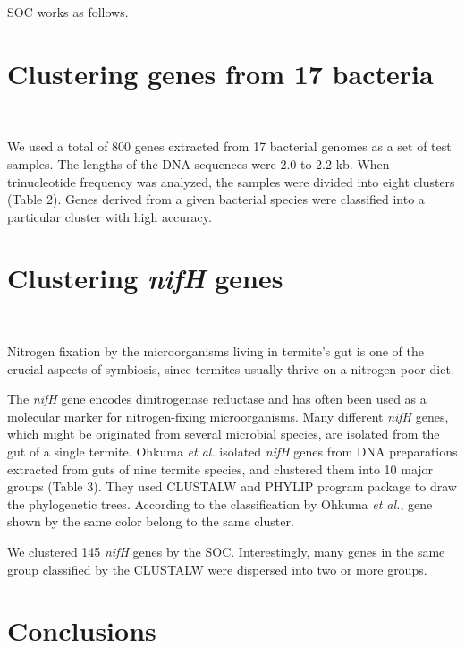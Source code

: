 \documentclass[portrait,a0]{a0poster}
\begin{document}
\begin{multicols}{3}
\vspace{-40pt} SOC works as follows.
\vspace{3mm}
\begin{flushleft}

\end{flushleft}

\vspace{-5mm}\section{Clustering genes from 17 bacteria}
\

\vspace{-40pt} We used a total of 800 genes extracted from 17 bacterial genomes as a set of test samples.
The lengths of the DNA sequences were 2.0 to 2.2 kb. 
When trinucleotide frequency was analyzed, the samples were divided into eight clusters (Table 2).
Genes derived from a given bacterial species were classified into a particular cluster with high accuracy.

\section{Clustering \textit{nifH} genes}
\

\vspace{-40pt} Nitrogen fixation by the microorganisms living in termite's gut is one of the crucial aspects of symbiosis, since termites usually thrive on a nitrogen-poor diet.
 
The \textit{nifH} gene encodes dinitrogenase reductase and has often been used as a molecular marker for nitrogen-fixing microorganisms. Many different \textit{nifH} genes, which might be originated from several microbial species, are isolated from the gut of a single termite. 
Ohkuma {\em et al.}\cite{Ohkuma} isolated \textit{nifH} genes from DNA preparations extracted from guts of nine termite species, and clustered them into 10 major groups (Table 3). They used CLUSTALW and PHYLIP program package to draw the phylogenetic trees. According to the classification by Ohkuma {\em et al.}, gene shown by the same color belong to the same cluster.

We clustered 145 \textit{nifH} genes by the SOC. Interestingly, many genes in the same group classified by the CLUSTALW were dispersed into two or more groups.

\section{Conclusions}


\end{multicols}
\end{document}
